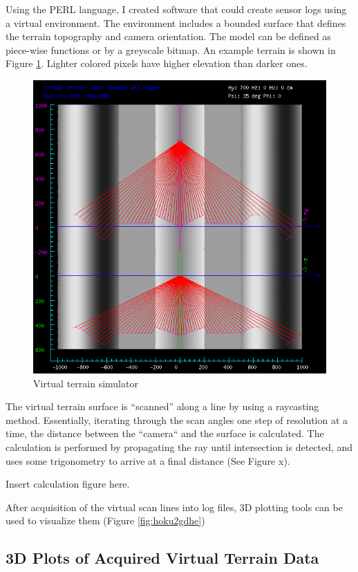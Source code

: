 \documentclass[a4paper,11pt]{report}
\begin{document}
Using the PERL language, I created software that could create sensor logs using a virtual environment. The environment includes a bounded surface that defines the terrain topography and camera orientation. The model can be defined as piece-wise functions or by a greyscale bitmap. An example terrain is shown in Figure \ref{fig:mkvirt}. Lighter colored pixels have higher elevation than darker ones.

\begin{figure}[ht]
 \centering
 \includegraphics[width=12cm]{Mkvirtsample.png}
 \caption{Virtual terrain simulator}
 \label{fig:mkvirt}
\end{figure}

The virtual terrain surface is ``scanned'' along a line by using a raycasting method. Essentially, iterating through the scan angles one step of resolution at a time, the distance between the ``camera`` and the surface is calculated. The calculation is performed by propagating the ray until intersection is detected, and uses some trigonometry to arrive at a final distance (See Figure x).

Insert calculation figure here.

After acquisition of the virtual scan lines into log files, 3D plotting tools can be used to visualize them (Figure \ref{fig:hoku2gdhe})

\subsection{3D Plots of Acquired Virtual Terrain Data}
\end{document}
